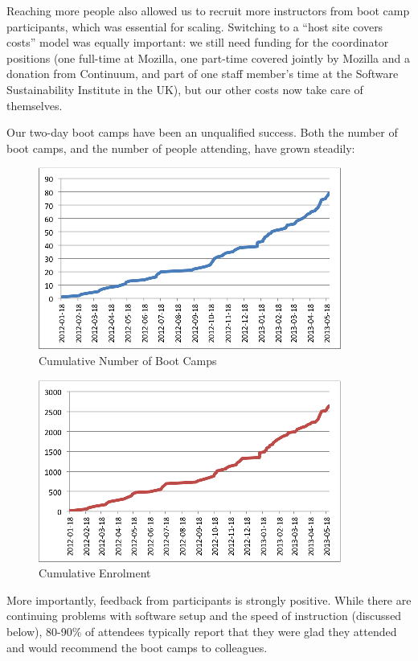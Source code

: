 \documentclass{article}
\begin{document}
Reaching more people also allowed us to recruit more instructors from
boot camp participants, which was essential for scaling. Switching to a
``host site covers costs'' model was equally important: we still need
funding for the coordinator positions (one full-time at Mozilla, one
part-time covered jointly by Mozilla and a donation from Continuum, and
part of one staff member's time at the Software Sustainability Institute
in the UK), but our other costs now take care of themselves.

Our two-day boot camps have been an unqualified success. Both the number
of boot camps, and the number of people attending, have grown steadily:

\begin{figure}[htbp]
\centering
\includegraphics{bootcamps.png}
\caption{Cumulative Number of Boot Camps}
\end{figure}

\begin{figure}[htbp]
\centering
\includegraphics{enrolment.png}
\caption{Cumulative Enrolment}
\end{figure}

More importantly, feedback from participants is strongly positive. While
there are continuing problems with software setup and the speed of
instruction (discussed below), 80-90\% of attendees typically report
that they were glad they attended and would recommend the boot camps to
colleagues.
\end{document}
